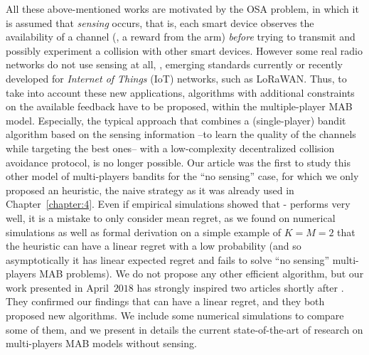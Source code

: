 All these above-mentioned works are motivated by the OSA problem, in which it is assumed that \emph{sensing} occurs, that is, each smart device observes the availability of a channel (\ie, a reward from the arm) \emph{before} trying to transmit and possibly experiment a collision with other smart devices.
However some real radio networks do not use sensing at all, \eg, emerging standards currently or recently developed for \emph{Internet of Things} (IoT) networks, such as LoRaWAN.
Thus, to take into account these new applications, algorithms with additional constraints on the available feedback have to be proposed, within the multiple-player MAB model.
Especially, the typical approach that combines a (single-player) bandit algorithm based on the sensing information --to learn the quality of the channels while targeting the best ones-- with a low-complexity decentralized collision avoidance protocol, is no longer possible.
%
Our article \cite{Besson2018ALT} was the first to study this other model of multi-players bandits for the ``no sensing'' case,
for which we only proposed an heuristic, the naive \Selfish{} strategy as it was already used in Chapter~\ref{chapter:4}.
Even if empirical simulations showed that \Selfish-\klUCB{} performs very well, it is a mistake to only consider mean regret, as we found on numerical simulations as well as formal derivation on a simple example of $K=M=2$ that the \Selfish{} heuristic can have a linear regret with a low probability (and so asymptotically it has linear expected regret and fails to solve ``no sensing'' multi-players MAB problems).
We do not propose any other efficient algorithm, but our work presented in April~$2018$ has strongly inspired two articles shortly after \cite{LugosiMehrabian18,BoursierPerchet18}.
They confirmed our findings that \Selfish{} can have a linear regret, and they both proposed new algorithms.
We include some numerical simulations to compare some of them, and we present in details the current state-of-the-art of research on multi-players MAB models without sensing.


